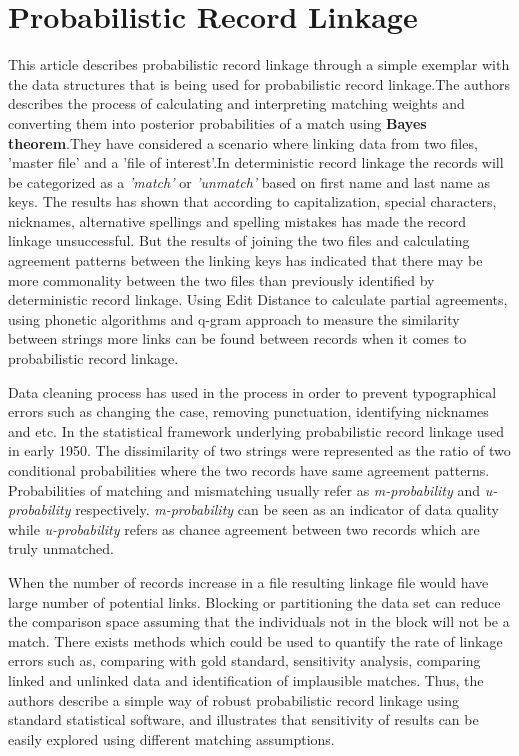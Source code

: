 \documentclass[a4paper]{article}
\begin{document}
\section*{Probabilistic Record Linkage}
This article \cite{Sayers2016ProbabilisticLinkage} describes probabilistic record linkage through a simple exemplar with the data structures that is being used for probabilistic record linkage.The authors describes the process of calculating and interpreting matching weights and converting them into posterior probabilities of a match using \textbf{Bayes theorem}.They have considered a scenario where linking data from two files, 'master file' and a 'file of interest'.In deterministic record linkage the records will be categorized as a \textit{'match'} or \textit{'unmatch'} based on first name and last name as keys. The results has shown that according to capitalization, special characters, nicknames, alternative spellings and spelling mistakes has made the record linkage unsuccessful. But the results of joining the two files and calculating agreement patterns between the linking keys has indicated that there may be more commonality between the two files than previously identified by deterministic record linkage. Using Edit Distance to calculate partial agreements, using phonetic algorithms and q-gram approach to measure the similarity between strings more links can be found between records when it comes to probabilistic record linkage.  

Data cleaning process has used in the process in order to prevent typographical errors such as changing the case, removing punctuation, identifying nicknames and etc. In the statistical framework underlying probabilistic record linkage used in early 1950. The dissimilarity of two strings were represented as the ratio of two conditional probabilities where the two records have same agreement patterns. Probabilities of matching and mismatching usually refer as \textit{m-probability} and \textit{u-probability} respectively. \textit{m-probability}  can be seen as an indicator of data quality while \textit{u-probability} refers as chance agreement between two records which are truly unmatched.

When the number of records increase in a file resulting linkage file would have large number of potential links. Blocking or partitioning the data set can reduce the comparison space assuming that the individuals not in the block will not be a match. There exists methods which could be used to quantify the rate of linkage errors such as, comparing with gold standard, sensitivity analysis, comparing linked and unlinked data and identification of implausible matches. Thus, the authors describe a simple way of robust probabilistic record linkage using standard statistical software, and illustrates that sensitivity of results can be easily explored using different matching assumptions.
\end{document}
